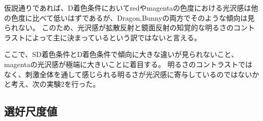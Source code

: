         仮説通りであれば、D着色条件においてredやmagentaの色度における光沢感は他の色度に比べて低いはずであるが、Dragon,Bunnyの両方でそのような傾向は見られない。
        このため、光沢感が拡散反射と鏡面反射の知覚的な明るさのコントラストによって主に決まっているという訳ではないと言える。

        ここで、SD着色条件とD着色条件で傾向に大きな違いが見られないこと、magentaの光沢感が極端に大きいことに着目する。
        明るさのコントラストではなく、刺激全体を通して感じられる明るさが光沢感に寄与しているのではないかと考え、次の実験2を行った。

    \subsection{選好尺度値}